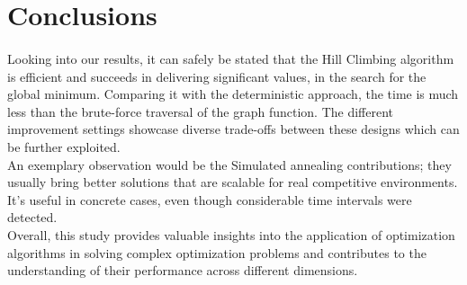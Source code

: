 \documentclass{article}
\begin{document}
\section{Conclusions}

\paragraph{}
Looking into our results, it can safely be stated that the Hill Climbing algorithm is efficient and succeeds in delivering significant values, in the search for the global minimum. Comparing it with the deterministic approach, the time is much less than the brute-force traversal of the graph function. The different improvement settings showcase diverse trade-offs between these designs which can be further exploited. \\

An exemplary observation would be the Simulated annealing contributions; they usually bring better solutions that are scalable for real competitive environments. It's useful in concrete cases, even though considerable time intervals were detected. \\

Overall, this study provides valuable insights into the application of optimization algorithms in solving complex optimization problems and contributes to the understanding of their performance across different dimensions. 

\end{document}
